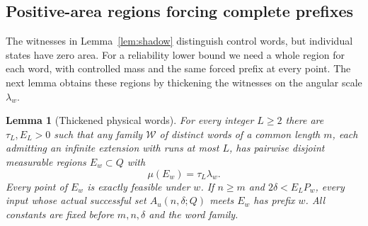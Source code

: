 \documentclass[11pt]{amsart}
\newtheorem{lemma}[theorem]{Lemma}
\theoremstyle{definition}
\theoremstyle{remark}
\numberwithin{equation}{section}
\begin{document}
\subsection{Positive-area regions forcing complete prefixes}
The witnesses in Lemma~\ref{lem:shadow} distinguish control words,
but individual states have zero area. For a reliability lower bound
we need a whole region for each word, with controlled mass and the
same forced prefix at every point. The next lemma obtains these
regions by thickening the witnesses on the angular scale
$\lambda_w$.
\begin{lemma}[Thickened physical words]\label{lem:massforcing}
For every integer $L\ge2$ there are $\tau_L,E_L>0$ such that
any family $\mathcal W$ of distinct words of a common length $m$,
each admitting an infinite extension with runs at most $L$, has
pairwise disjoint measurable regions $E_w\subset Q$ with
\begin{equation}\label{eq:forcedmass}
\mu(E_w)=\tau_L\lambda_w.
\end{equation}
Every point of $E_w$ is exactly feasible under $w$.
If $n\ge m$ and $2\delta<E_LP_w$, every input whose actual
successful set $A_u(n,\delta;Q)$ meets $E_w$ has prefix $w$.
All constants are fixed before $m,n,\delta$ and the word family.
\end{lemma}
\end{document}
